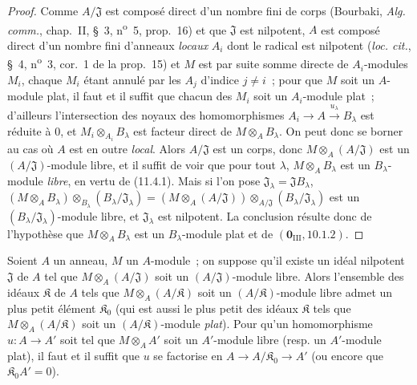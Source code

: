 \begin{proof}
Comme $A/\mathfrak J$ est composé direct d'un nombre fini de corps (Bourbaki,
\emph{Alg. comm.}, chap.~II, \S~3, n\textsuperscript{o}~5, prop.~16) et que $\mathfrak J$
est nilpotent, $A$ est composé direct d'un nombre fini d'anneaux \emph{locaux} $A_i$
dont le radical est nilpotent (\emph{loc. cit.}, \S~4, n\textsuperscript{o}~3, cor.~1 de
la prop.~15) et $M$ est par suite somme directe de $A_i$-modules $M_i$, chaque
$M_i$ étant annulé par les $A_j$ d'indice $j\neq i$~; pour que $M$ soit un
$A$-module plat, il faut et il suffit que chacun des $M_i$ soit un $A_i$-module
plat~; d'ailleurs l'intersection des noyaux des homomorphismes
$A_i\longrightarrow A\xrightarrow{u_\lambda}B_\lambda$
est réduite à $0$, et $M_i\otimes_{A_i}B_\lambda$ est facteur direct de
$M\otimes_A B_\lambda$. On peut donc se borner au cas où $A$ est en outre
\emph{local}. Alors $A/\mathfrak J$ est un corps, donc
$M\otimes_A(A/\mathfrak J)$ est un $(A/\mathfrak J)$-module libre, et il
suffit de voir que pour tout $\lambda$, $M\otimes_A B_\lambda$ est un
$B_\lambda$-module \emph{libre}, en vertu de (11.4.1). Mais si l'on pose
$\mathfrak J_\lambda=\mathfrak JB_\lambda$,
$(M\otimes_A B_\lambda)\otimes_{B_\lambda}(B_\lambda/\mathfrak J_\lambda)
=(M\otimes_A(A/\mathfrak J))\otimes_{A/\mathfrak J}
 (B_\lambda/\mathfrak J_\lambda)$
est un $(B_\lambda/\mathfrak J_\lambda)$-module libre, et
$\mathfrak J_\lambda$ est nilpotent. La conclusion résulte donc de l'hypothèse
que $M\otimes_A B_\lambda$ est un $B_\lambda$-module plat et de
$(\mathbf 0_{\mathrm{III}},10.1.2)$.
\end{proof}

\begin{corollary}[11.4.4]
\label{IV.11.4.4-fr}
Soient $A$ un anneau, $M$ un $A$-module~; on suppose qu'il existe un idéal
nilpotent $\mathfrak J$ de $A$ tel que $M\otimes_A(A/\mathfrak J)$ soit un
$(A/\mathfrak J)$-module libre. Alors l'ensemble des idéaux $\mathfrak K$ de
$A$ tels que $M\otimes_A(A/\mathfrak K)$ soit un $(A/\mathfrak K)$-module
libre admet un plus petit élément $\mathfrak K_0$ \textup{(qui est aussi le plus petit
des idéaux $\mathfrak K$ tels que $M\otimes_A(A/\mathfrak K)$ soit un
$(A/\mathfrak K)$-module \emph{plat})}.
Pour qu'un homomorphisme $u:A\to A'$ soit tel que $M\otimes_A A'$ soit un
$A'$-module libre \textup{(resp.} un $A'$-module plat), il faut et il suffit que $u$ se
factorise en $A\to A/\mathfrak K_0\to A'$ \textup{(ou encore que
$\mathfrak K_0A'=0$)}.
\end{corollary}

